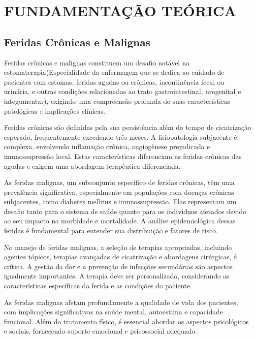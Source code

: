 \section{FUNDAMENTAÇÃO TEÓRICA}

\subsection{Feridas Crônicas e Malignas}

Feridas crônicas e malignas constituem um desafio notável na estomaterapia(Especialidade da enfermagem que se dedica ao cuidado de pacientes com estomas, feridas agudas ou crônicas, incontinência fecal ou urinária, e outras condições relacionadas ao trato gastrointestinal, urogenital e integumentar), exigindo uma compreensão profunda de suas características patológicas e implicações clínicas.

Feridas crônicas são definidas pela sua persistência além do tempo de cicatrização esperado, frequentemente excedendo três meses. A fisiopatologia subjacente é complexa, envolvendo inflamação crônica, angiogênese prejudicada e imunossupressão local. Estas características diferenciam as feridas crônicas das agudas e exigem uma abordagem terapêutica diferenciada.

As feridas malignas, um subconjunto específico de feridas crônicas, têm uma prevalência significativa, especialmente em populações com doenças crônicas subjacentes, como diabetes mellitus e imunossupressão. Elas representam um desafio tanto para o sistema de saúde quanto para os indivíduos afetados devido ao seu impacto na morbidade e mortalidade. A análise epidemiológica dessas feridas é fundamental para entender sua distribuição e fatores de risco.

No manejo de feridas malignas, a seleção de terapias apropriadas, incluindo agentes tópicos, terapias avançadas de cicatrização e abordagens cirúrgicas, é crítica. A gestão da dor e a prevenção de infecções secundárias são aspectos igualmente importantes. A terapia deve ser personalizada, considerando as características específicas da ferida e as condições do paciente.

As feridas malignas afetam profundamente a qualidade de vida dos pacientes, com implicações significativas na saúde mental, autoestima e capacidade funcional. Além do tratamento físico, é essencial abordar os aspectos psicológicos e sociais, fornecendo suporte emocional e psicossocial adequado.

